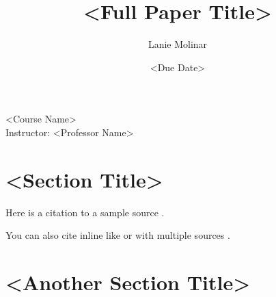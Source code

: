 \documentclass[12pt,letterpaper]{article}
\title{<Full Paper Title>}
\author{Lanie Molinar\\<Institution Name>}
\date{<Due Date>}
\begin{document}
\begin{titlepage}
\maketitle
\thispagestyle{empty}

\begin{center}
<Course Name>\\
\vspace{1em}
Instructor: <Professor Name>
\end{center}
\end{titlepage}

\setcounter{page}{1}

\section{<Section Title>}

Here is a citation to a sample source \parencite{smith2020}.

You can also cite inline like \textcite{smith2020} or with multiple sources \parencite{smith2020,doe2021}.

\section{<Another Section Title>}

\newpage
\printbibliography[heading=bibintoc]
\end{document}
